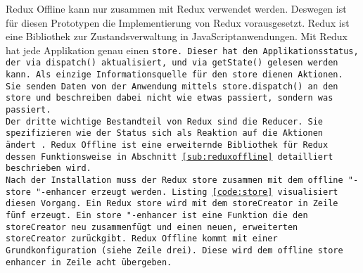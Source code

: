%
%
Redux Offline kann nur zusammen mit Redux verwendet werden. Deswegen ist für diesen Prototypen die Implementierung von Redux vorausgesetzt.
Redux ist eine Bibliothek zur Zustandsverwaltung in JavaScriptanwendungen.
Mit Redux hat jede Applikation genau einen \tt{store}. Dieser hat den Applikationsstatus, der via \tt{dispatch()} aktualisiert, und via \tt{getState()} gelesen werden kann.
Als einzige Informationsquelle für den \tt{store} dienen Aktionen. Sie senden Daten von der Anwendung mittels \tt{store.dispatch()} an den \tt{store} und beschreiben dabei nicht wie etwas passiert, sondern was passiert.\\
Der dritte wichtige Bestandteil von Redux sind die \tt{Reducer}. Sie spezifizieren wie der Status sich als Reaktion auf die Aktionen ändert~\cite{redux}.
% 
Redux Offline ist eine erweiternde Bibliothek für Redux dessen Funktionsweise in Abschnitt \ref{sub:reduxoffline} detailliert beschrieben wird.\\
Nach der Installation muss der Redux \tt{store} zusammen mit dem \tt{offline "-store "-enhancer} erzeugt werden. Listing \ref{code:store} visualisiert diesen Vorgang. Ein Redux \tt{store} wird mit dem \tt{storeCreator} in Zeile fünf erzeugt. Ein \tt{store "-enhancer} ist eine Funktion die den \tt{storeCreator} neu zusammenfügt und einen neuen, erweiterten \tt{storeCreator} zurückgibt.
Redux Offline kommt mit einer Grundkonfiguration (siehe Zeile drei). Diese wird dem \tt{offline store enhancer} in Zeile acht übergeben.
\begin{center}
  
\end{center}
